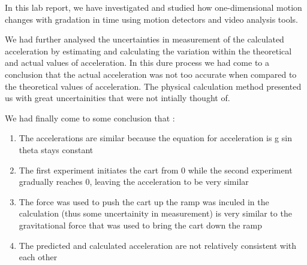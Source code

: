{In this lab report, we have investigated and studied how one-dimensional motion changes with gradation in time using motion detectors and video analysis tools.}

{We had further analysed the uncertainties in measurement of the calculated acceleration by estimating and calculating the variation within the theoretical and actual values of acceleration. In this dure process we had come to a conclusion that the actual acceleration was not too accurate when compared to the theoretical values of acceleration. The physical calculation method presented us with great uncertainities that were not intially thought of.}

{We had finally come to some conclusion that : }

\begin{enumerate}
	\item {The accelerations are similar because the equation for acceleration is g sin theta stays constant}
	\item {The first experiment initiates the cart from 0 while the second experiment gradually reaches 0, leaving the acceleration to be very similar}
	\item {The force was used to push the cart up the ramp was inculed in the calculation (thus some uncertainity in measurement) is very similar to the gravitational force that was used to bring the cart down the ramp}
	\item {The predicted and calculated acceleration are not relatively consistent with each other}
\end{enumerate}

